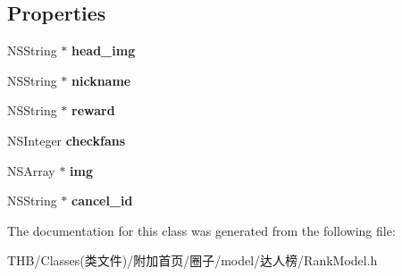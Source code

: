 \subsection*{Properties}
\begin{DoxyCompactItemize}
\item 
\mbox{\label{interface_rank_model_a5913bc79710cf23763262689a59e86e4}} 
N\+S\+String $\ast$ {\bfseries head\+\_\+img}
\item 
\mbox{\label{interface_rank_model_ae28cb1c6819fa7cbdd4f26edb159c468}} 
N\+S\+String $\ast$ {\bfseries nickname}
\item 
\mbox{\label{interface_rank_model_af1cadce4ceac1c3a1b6e80aa3c055c63}} 
N\+S\+String $\ast$ {\bfseries reward}
\item 
\mbox{\label{interface_rank_model_a1660e4c505d16348d97011ca569ec940}} 
N\+S\+Integer {\bfseries checkfans}
\item 
\mbox{\label{interface_rank_model_a02f2b0a311e2549527918033a7e6fe91}} 
N\+S\+Array $\ast$ {\bfseries img}
\item 
\mbox{\label{interface_rank_model_ad64103f6bfa29530035b9f4c9b875c55}} 
N\+S\+String $\ast$ {\bfseries cancel\+\_\+id}
\end{DoxyCompactItemize}


The documentation for this class was generated from the following file\+:\begin{DoxyCompactItemize}
\item 
T\+H\+B/\+Classes(类文件)/附加首页/圈子/model/达人榜/Rank\+Model.\+h\end{DoxyCompactItemize}
